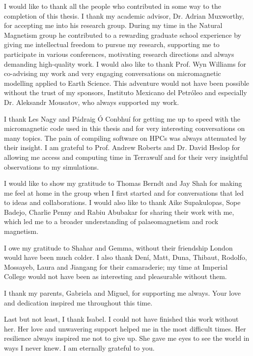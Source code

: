 \let\cleardoublepage\clearpage
{}
{}

\begin{acknowledgements}
I would like to thank all the people who contributed in some way to the completion of this thesis. I thank my academic advisor, Dr. Adrian Muxworthy, for accepting me into his research group. During my time in the Natural Magnetism group he contributed to a rewarding graduate school experience by giving me intellectual freedom to pursue my research, supporting me to participate in various conferences, motivating research directions and always demanding high-quality work. I would also like to thank Prof. Wyn Williams for co-advising my work and very engaging conversations on micromagnetic modelling applied to Earth Science. This adventure would not have been possible without the trust of my sponsors, Instituto Mexicano del Petr\'oleo and especially Dr. Aleksandr Mousatov, who always supported my work.\par

I thank Les Nagy and P\'adraig \'O Conbhu\'i for getting me up to speed with the micromagnetic code used in this thesis and for very interesting conversations on many topics. The pain of compiling software on HPCs was always attenuated by their insight. I am grateful to Prof. Andrew Roberts and Dr. David Heslop for allowing me access and computing time in Terrawulf and for their very insightful observations to my simulations.\par

I would like to show my gratitude to Thomas Berndt and Jay Shah for making me feel at home in the group when I first started and for conversations that led to ideas and collaborations. I would also like to thank Aike Supakulopas, Sope Badejo, Charlie Penny and Rabiu Abubakar for sharing their work with me, which led me to a broader understanding of palaeomagnetism and rock magnetism.\par

I owe my gratitude to Shahar and Gemma, without their friendship London would have been much colder. I also thank Den\'i, Matt, Duna, Thibaut, Rodolfo, Mossayeb, Laura and Jiangang for their camaraderie; my time at Imperial College would not have been as interesting and pleasurable without them.\par

I thank my parents, Gabriela and Miguel, for supporting me always. Your love and dedication inspired me throughout this time.\par

Last but not least, I thank Isabel. I could not have finished this work without her. Her love and unwavering support helped me in the most difficult times. Her resilience always inspired me not to give up. She gave me eyes to see the world in ways I never knew. I am eternally grateful to you.\par
\end{acknowledgements}
